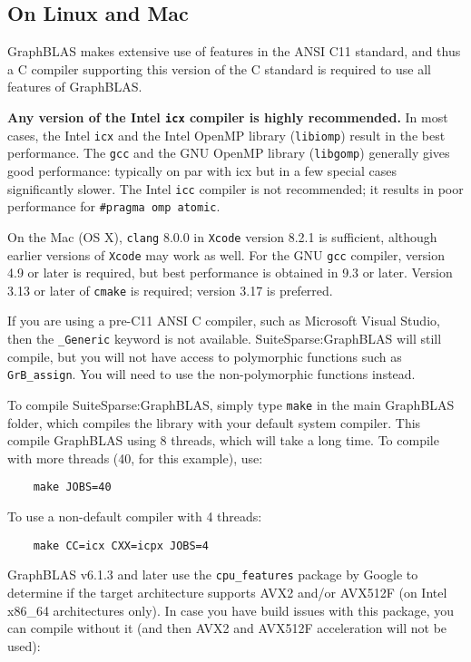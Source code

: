 \documentclass[12pt]{article}
\begin{document}
\subsection{On Linux and Mac}

GraphBLAS makes extensive use of features in the ANSI C11 standard, and thus a
C compiler supporting this version of the C standard is required to use
all features of GraphBLAS.

{\bf Any version of the Intel \verb'icx' compiler is highly recommended.} In
most cases, the Intel \verb'icx' and the Intel OpenMP library (\verb'libiomp')
result in the best performance.  The \verb'gcc' and the GNU OpenMP library
(\verb'libgomp') generally gives good performance: typically on par with icx
but in a few special cases significantly slower.  The Intel \verb'icc' compiler
is not recommended; it results in poor performance for
\verb'#pragma omp atomic'.

On the Mac (OS X), \verb'clang' 8.0.0 in \verb'Xcode' version 8.2.1 is
sufficient, although earlier versions of \verb'Xcode' may work as well.  For
the GNU \verb'gcc' compiler, version 4.9 or later is required, but best
performance is obtained in 9.3 or later.  Version 3.13 or later of \verb'cmake'
is required; version 3.17 is preferred.

If you are using a pre-C11 ANSI C compiler, such as Microsoft Visual Studio,
then the \verb'_Generic' keyword is not available.  SuiteSparse:GraphBLAS
will still compile, but you will not have access to polymorphic functions
such as \verb'GrB_assign'.  You will need to use the non-polymorphic functions
instead.

To compile SuiteSparse:GraphBLAS, simply type \verb'make' in the main GraphBLAS
folder, which compiles the library with your default system compiler.  This
compile GraphBLAS using 8 threads, which will take a long time.  To compile with
more threads (40, for this example), use:

    {\small
    \begin{verbatim}
    make JOBS=40 \end{verbatim} }

To use a non-default compiler with 4 threads:

    {\small
    \begin{verbatim}
    make CC=icx CXX=icpx JOBS=4 \end{verbatim} }

GraphBLAS v6.1.3 and later use the \verb'cpu_features' package by Google to
determine if the target architecture supports AVX2 and/or AVX512F (on Intel
x86\_64 architectures only).  In case you have build issues with this package,
you can compile without it (and then AVX2 and AVX512F acceleration will not
be used):
\end{document}
